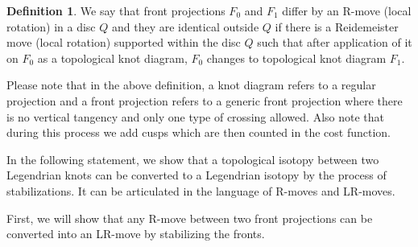 \documentclass[11pt]{amsart}
\numberwithin{equation}{section}
\theoremstyle{plain}
\theoremstyle{definition}
\newtheorem{definition}[equation]{Definition}
\theoremstyle{remark} \newtheorem{remark}[equation]{Remark}
\theoremstyle{remark} \newtheorem{observation}[equation]{Observation}
\begin{document}
\begin{definition}
We say that front projections $F_0$ and $F_1$ differ by an R-move (local rotation) in a disc $Q$ and they are identical outside $Q$ if there is a 
Reidemeister move (local rotation) supported within the disc $Q$ such that after application of it on $F_0$ as a topological knot diagram, $F_0$ changes to topological knot diagram $F_1$. 
\end{definition}

Please note that in the above definition, a knot diagram refers to a regular projection and a front projection refers to a generic front projection where there is no vertical tangency and only one type of crossing allowed. Also note that during this process we add cusps which are then counted in the cost function.

In the following statement, we show that a topological isotopy between two Legendrian knots can be converted to a Legendrian isotopy by the process of stabilizations. It can be articulated in the language of R-moves and LR-moves.

First, we will show that any R-move between two front projections can be converted into an LR-move by stabilizing the fronts. 
\end{document}
